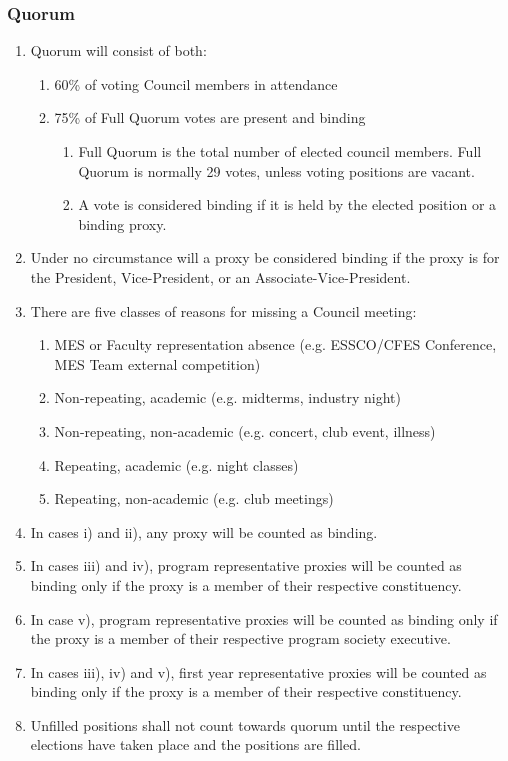 \subsubsection{Quorum}
\label{quorum}

\begin{enumerate}
 \item
  Quorum will consist of both:

  \begin{enumerate}
   \item
    60\% of voting Council members in attendance
   \item
    75\% of Full Quorum votes are present and binding

    \begin{enumerate}
     \item
      Full Quorum is the total number of elected council members. Full Quorum is normally 29 votes, unless voting positions are vacant.
     \item
      A vote is considered binding if it is held by the elected position or a binding proxy.
    \end{enumerate}
  \end{enumerate}
 \item
  Under no circumstance will a proxy be considered binding if the proxy is for the President, Vice-President, or an Associate-Vice-President.
 \item
  There are five classes of reasons for missing a Council meeting:

  \begin{enumerate}
   \item
    MES or Faculty representation absence (e.g. ESSCO/CFES Conference, MES Team external competition)
   \item
    Non-repeating, academic (e.g. midterms, industry night)
   \item
    Non-repeating, non-academic (e.g. concert, club event, illness)
   \item
    Repeating, academic (e.g. night classes)
   \item
    Repeating, non-academic (e.g. club meetings)
  \end{enumerate}
 \item
  In cases i) and ii), any proxy will be counted as binding.
 \item
  In cases iii) and iv), program representative proxies will be counted as binding only if the proxy is a member of their respective constituency.
 \item
  In case v), program representative proxies will be counted as binding only if the proxy is a member of their respective program society executive.
 \item
  In cases iii), iv) and v), first year representative proxies will be counted as binding only if the proxy is a member of their respective constituency.
 \item
  Unfilled positions shall not count towards quorum until the respective elections have taken place and the positions are filled.

\end{enumerate}

